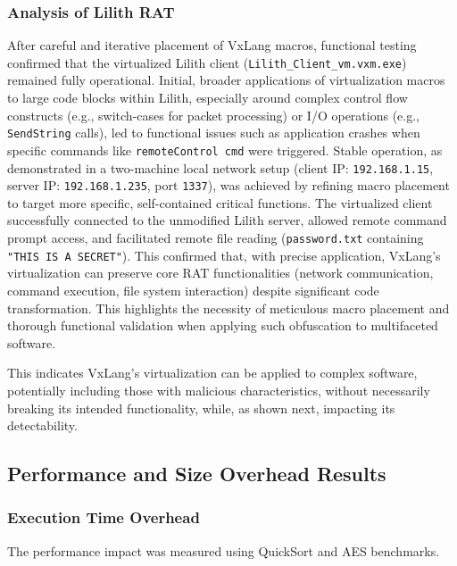 \subsubsection{Analysis of Lilith RAT}

After careful and iterative placement of VxLang macros, functional testing confirmed that the virtualized Lilith client (\texttt{Lilith\_Client\_vm.vxm.exe}) remained fully operational. Initial, broader applications of virtualization macros to large code blocks within Lilith, especially around complex control flow constructs (e.g., switch-cases for packet processing) or I/O operations (e.g., \texttt{SendString} calls), led to functional issues such as application crashes when specific commands like \texttt{remoteControl cmd} were triggered. Stable operation, as demonstrated in a two-machine local network setup (client IP: \texttt{192.168.1.15}, server IP: \texttt{192.168.1.235}, port \texttt{1337}), was achieved by refining macro placement to target more specific, self-contained critical functions. The virtualized client successfully connected to the unmodified Lilith server, allowed remote command prompt access, and facilitated remote file reading (\texttt{password.txt} containing \texttt{"THIS IS A SECRET"}). This confirmed that, with precise application, VxLang's virtualization can preserve core RAT functionalities (network communication, command execution, file system interaction) despite significant code transformation. This highlights the necessity of meticulous macro placement and thorough functional validation when applying such obfuscation to multifaceted software.

This indicates VxLang's virtualization can be applied to complex software, potentially including those with malicious characteristics, without necessarily breaking its intended functionality, while, as shown next, impacting its detectability.

\subsection{Performance and Size Overhead Results}

\subsubsection{Execution Time Overhead}
The performance impact was measured using QuickSort and AES benchmarks.

